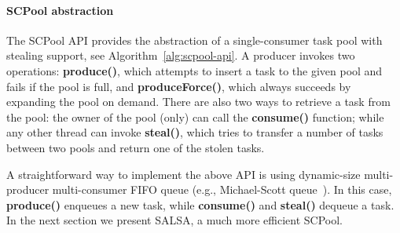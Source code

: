 \paragraph{SCPool abstraction}

The SCPool API provides the abstraction of a single-consumer task pool with stealing support, see Algorithm~\ref{alg:scpool-api}.
A producer invokes two operations: {\bf produce()}, which attempts to insert a task to the given pool and fails if the pool is full, and {\bf produceForce()}, which always succeeds by expanding the pool on demand.
There are also two ways to retrieve a task from the pool: the owner of the pool (only) can call the {\bf consume()} function; while any other thread can invoke {\bf steal()}, which tries to transfer a number of tasks between two pools and return one of the stolen tasks. 

A straightforward way to implement the above API is using dynamic-size multi-producer multi-consumer FIFO queue (e.g., Michael-Scott queue~\cite{Michael:1996:SFP:248052.248106}).
In this case, {\bf produce()} enqueues a new task, while {\bf consume()} and {\bf steal()} dequeue a task. In the next section we present SALSA, a much more efficient SCPool.


